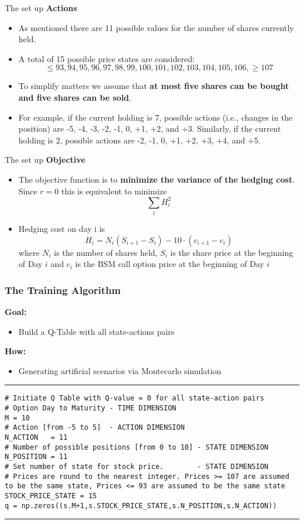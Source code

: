\documentclass[11pt]{beamer}
\begin{document}
\begin{frame}{The set up }
\textbf{Actions}
	\begin{itemize}
		\item As mentioned there are 11 possible values for the number of shares currently held. 
		\item A total of 15 possible price states are considered:$$\le93, 94, 95, 96, 97, 98, 99, 100, 101, 102, 103, 104, 105, 106, \ge107$$
		\item To simplify matters we assume that \textbf{at most five shares can be bought and five shares can be sold}. 
		\item For example, if the current holding is 7, possible actions (i.e., changes in the position) are -5, -4, -3, -2, -1, 0, +1, +2, and +3. Similarly, if the current holding is 2, possible actions are -2, -1, 0, +1, +2, +3, +4, and +5.
	\end{itemize}
\end{frame}
\begin{frame}{The set up }
\textbf{Objective}
	\begin{itemize}
		\item The objective function is to \textbf{minimize the variance of the hedging cost}. Since $r=0$ this is equivalent to minimize $$\sum\limits_i H_i^2$$
		\item Hedging cost on day i is $$H_i = N_i(S_{i+1}-S_i)-10\cdot (c_{i+1}-c_i)  $$ where $N_i$ is the number of shares held, $S_i$ is the share price      at the beginning of Day $i$ and $c_i$ is the BSM call option price at the beginning of Day $i$
	\end{itemize}
\end{frame}
\begin{frame}[fragile]
\frametitle{The Training Algorithm}
\footnotesize
	\textbf{Goal:}
	\begin{itemize}
		\item Build a Q-Table with all state-actions pairs
	\end{itemize}
	\textbf{How:}
	\begin{itemize}
		\item Generating artificial scenarios via Montecarlo simulation
	\end{itemize}
\rule{\textwidth}{1pt}
\begin{verbatim}
# Initiate Q Table with Q-value = 0 for all state-action pairs
# Option Day to Maturity - TIME DIMENSION
M = 10
# Action [from -5 to 5]  - ACTION DIMENSION 
N_ACTION   = 11
# Number of possible positions [from 0 to 10] - STATE DIMENSION 
N_POSITION = 11
# Set number of state for stock price.        - STATE DIMENSION 
# Prices are round to the nearest integer. Prices >= 107 are assumed to be the same state, Prices <= 93 are assumed to be the same state
STOCK_PRICE_STATE = 15 
q = np.zeros((s.M+1,s.STOCK_PRICE_STATE,s.N_POSITION,s.N_ACTION))
\end{verbatim}
\rule{\textwidth}{1pt}

\end{frame}
\end{document}
